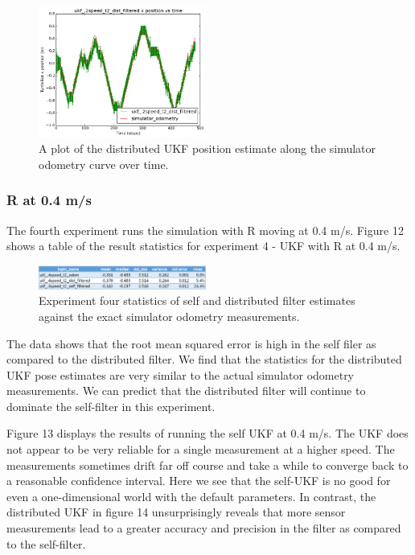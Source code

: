\documentclass[conference]{IEEEtran} \usepackage[T1]{fontenc} \usepackage[backend=biber, style=ieee]{biblatex}
\begin{document}
\begin{figure}
\centering 
\includegraphics[width=0.49\textwidth]{ukf_2speed_t2_dist_filtered_pos_err_graph}
\caption {A plot of the distributed UKF position estimate along the simulator odometry curve over time.}
\label{pic11} 
\end{figure}

\subsubsection{R at 0.4 m/s} \label{UKF .4}
The fourth experiment runs the simulation with R moving at 0.4 m/s. Figure 12 shows a table of the result statistics for experiment 4 - UKF 
with R at 0.4 m/s. 

\begin{figure}[!ht]
\label{pic12} 
\centering 
\includegraphics[width=0.49\textwidth]{ukf_4_table}
\caption{Experiment four statistics of self and distributed filter estimates against the exact simulator odometry measurements.} 
\end{figure}

The data shows that the root mean squared error is high in the self filer as compared to the distributed filter. 
We find that the statistics for the distributed UKF pose estimates are very similar to the actual simulator 
odometry measurements. We can predict that the distributed filter will continue to dominate the self-filter in 
this experiment.

Figure 13 displays the results of running the self UKF at 0.4 m/s. The UKF does not 
appear to be very reliable for a single measurement at a higher speed. The measurements 
sometimes drift far off course and take a while to converge back to a reasonable 
confidence interval. Here we see that the self-UKF is no good for even a one-dimensional world with the default parameters.
In contrast, the distributed UKF in figure 14 unsurprisingly reveals that more sensor measurements lead to a greater
accuracy and precision in the filter as compared to the self-filter. 
\end{document}
